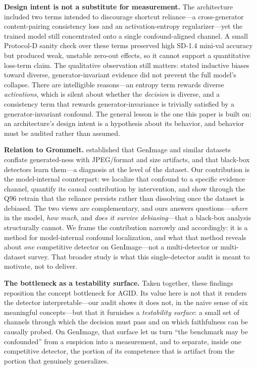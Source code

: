 \textbf{Design intent is not a substitute for measurement.} The architecture included two terms intended to discourage shortcut reliance---a cross-generator content-pairing consistency loss and an activation-entropy regularizer---yet the trained model still concentrated onto a single confound-aligned channel. A small Protocol-D sanity check over these terms preserved high SD-1.4 mini-val accuracy but produced weak, unstable zero-out effects, so it cannot support a quantitative loss-term claim. The qualitative observation still matters: stated inductive biases toward diverse, generator-invariant evidence did not prevent the full model's collapse. There are intelligible reasons---an entropy term rewards diverse \emph{activations}, which is silent about whether the \emph{decision} is diverse, and a consistency term that rewards generator-invariance is trivially satisfied by a generator-invariant confound. The general lesson is the one this paper is built on: an architecture's design intent is a hypothesis about its behavior, and behavior must be audited rather than assumed.

\textbf{Relation to Grommelt.} \citet{grommelt2024fakejpeg} established that GenImage and similar datasets conflate generated-ness with JPEG/format and size artifacts, and that black-box detectors learn them---a diagnosis at the level of the dataset. Our contribution is the model-internal counterpart: we localize that confound to a specific evidence channel, quantify its causal contribution by intervention, and show through the Q96 retrain that the reliance persists rather than dissolving once the dataset is debiased. The two views are complementary, and ours answers questions---\emph{where} in the model, \emph{how much}, and \emph{does it survive debiasing}---that a black-box analysis structurally cannot. We frame the contribution narrowly and accordingly: it is a method for model-internal confound localization, and what that method reveals about \emph{one} competitive detector on GenImage---not a multi-detector or multi-dataset survey. That broader study is what this single-detector audit is meant to motivate, not to deliver.

\textbf{The bottleneck as a testability surface.} Taken together, these findings reposition the concept bottleneck for AGID. Its value here is not that it renders the detector interpretable---our audit shows it does not, in the naive sense of six meaningful concepts---but that it furnishes a \emph{testability surface}: a small set of channels through which the decision must pass and on which faithfulness can be causally probed. On GenImage, that surface let us turn ``the benchmark may be confounded'' from a suspicion into a measurement, and to separate, inside one competitive detector, the portion of its competence that is artifact from the portion that genuinely generalizes.

